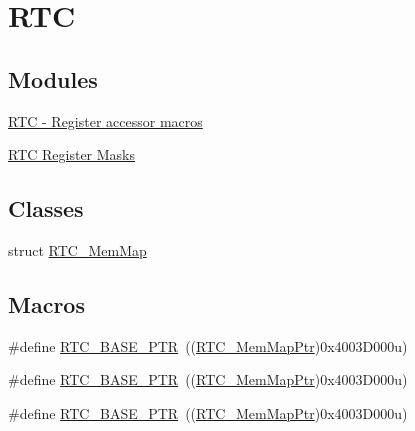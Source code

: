 \hypertarget{group___r_t_c___peripheral}{}\section{R\+TC}
\label{group___r_t_c___peripheral}
\subsection*{Modules}
\begin{DoxyCompactItemize}
\item 
\hyperlink{group___r_t_c___register___accessor___macros}{R\+T\+C -\/ Register accessor macros}
\item 
\hyperlink{group___r_t_c___register___masks}{R\+T\+C Register Masks}
\end{DoxyCompactItemize}
\subsection*{Classes}
\begin{DoxyCompactItemize}
\item 
struct \hyperlink{struct_r_t_c___mem_map}{R\+T\+C\+\_\+\+Mem\+Map}
\end{DoxyCompactItemize}
\subsection*{Macros}
\begin{DoxyCompactItemize}
\item 
\#define \hyperlink{group___r_t_c___peripheral_ga6455e2b767b4b224b4f00b50e87a2441}{R\+T\+C\+\_\+\+B\+A\+S\+E\+\_\+\+P\+TR}~((\hyperlink{group___r_t_c___peripheral_gac92da66fe1171e5751505df29917b152}{R\+T\+C\+\_\+\+Mem\+Map\+Ptr})0x4003\+D000u)
\item 
\#define \hyperlink{group___r_t_c___peripheral_ga6455e2b767b4b224b4f00b50e87a2441}{R\+T\+C\+\_\+\+B\+A\+S\+E\+\_\+\+P\+TR}~((\hyperlink{group___r_t_c___peripheral_gac92da66fe1171e5751505df29917b152}{R\+T\+C\+\_\+\+Mem\+Map\+Ptr})0x4003\+D000u)
\item 
\#define \hyperlink{group___r_t_c___peripheral_ga6455e2b767b4b224b4f00b50e87a2441}{R\+T\+C\+\_\+\+B\+A\+S\+E\+\_\+\+P\+TR}~((\hyperlink{group___r_t_c___peripheral_gac92da66fe1171e5751505df29917b152}{R\+T\+C\+\_\+\+Mem\+Map\+Ptr})0x4003\+D000u)
\end{DoxyCompactItemize}
